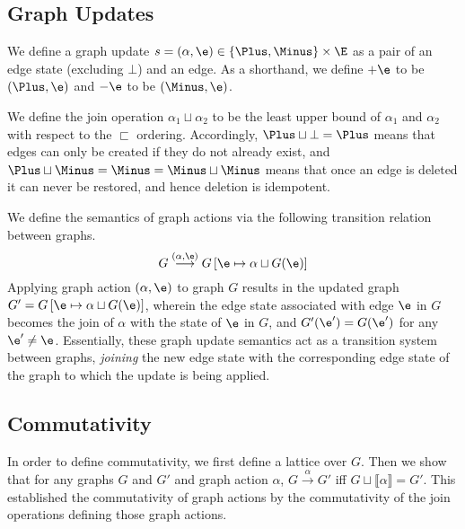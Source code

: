 
\subsection{Graph Updates}
\label{sub:Graph Updates}

We define a graph update $s = (\alpha,\e) \in \left\{\Plus, \Minus\right\} \times \E$
as a pair of an edge state (excluding $\bot$) and an edge. As a shorthand, we
define $+\e$ to be $(\Plus, \e)$ and $-\e$ to be $(\Minus, \e)$.

We define the join operation $\alpha_1 \sqcup \alpha_2$ to be the least upper bound of
$\alpha_1$ and $\alpha_2$ with respect to the $\sqsubset$ ordering. Accordingly, $\Plus
\sqcup \bot = \Plus$ means that edges can only be created if they do not already
exist, and $\Plus \sqcup \Minus = \Minus = \Minus \sqcup \Minus$ means that once
an edge is deleted it can never be restored, and hence deletion is idempotent.

We define the semantics of graph actions via the following transition relation
between graphs.
\[
  G \overset{(\alpha,\e)}{\longrightarrow} G\left[ \e \mapsto \alpha \sqcup G(\e) \right]
\]
Applying graph action $\left(\alpha, \e\right)$ to graph $G$ results in the
updated graph $G' = G\left[\e \mapsto \alpha \sqcup G(\e) \right]$, wherein the edge
state associated with edge $\e$ in $G$ becomes the join of $\alpha$ with the state of
$\e$ in $G$, and $G'(\e') = G(\e')$ for any $\e' \ne \e$. Essentially, these graph update semantics act as a transition system between graphs, \emph{joining} the new edge state with the corresponding edge state of the graph to which the update is being applied.



\subsection{Commutativity}%
\label{sub:Commutativity:formal}

In order to define commutativity, we first define a lattice over $G$.
Then we show that for any graphs $G$ and $G'$ and graph action $\alpha$,
$G \overset{\alpha}\rightarrow G'$
iff $G \sqcup \llbracket\alpha\rrbracket = G'$.
This established the commutativity of graph actions
by the commutativity of the join operations defining those graph actions.

